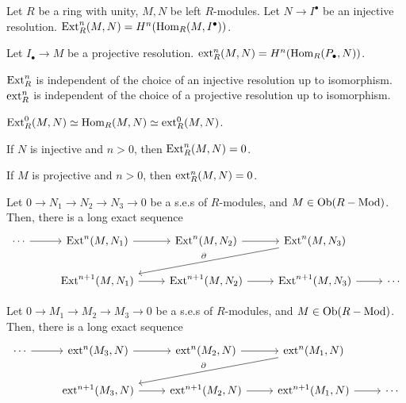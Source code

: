 \documentclass{article}
\begin{document}
\begin{definition}
  Let \(R\) be a ring with unity, \(M, N\) be left \(R\)-modules.
  Let \(N \to I^\bullet\) be an injective resolution.
  \(\textnormal{Ext}_R^n(M, N) = H^n(\textnormal{Hom}_R(M, I^\bullet))\).

  Let \(I_\bullet \to M\) be a projective resolution.
  \(\textnormal{ext}_R^n(M, N) = H^n(\textnormal{Hom}_R(P_\bullet, N))\).
\end{definition}

\begin{theorem}
  \(\textnormal{Ext}_R^n\) is independent of the choice of an injective resolution
  up to isomorphism.
  \(\textnormal{ext}_R^n\) is independent of the choice of a projective resolution
  up to isomorphism.
\end{theorem}

\begin{theorem}
  \(\textnormal{Ext}_R^0(M, N) \simeq \textnormal{Hom}_R(M, N) \simeq \textnormal{ext}_R^0(M, N)\).
\end{theorem}

\begin{theorem}
  If \(N\) is injective and \(n > 0\),
  then \(\textnormal{Ext}_R^n(M, N) = 0\).

  If \(M\) is projective and \(n > 0\),
  then \(\textnormal{ext}_R^n(M, N) = 0\).
\end{theorem}

\begin{theorem}
  Let \(0 \to N_1 \to N_2 \to N_3 \to 0\) be a s.e.s of \(R\)-modules,
  and \(M \in \textnormal{Ob}(R-\textnormal{Mod})\).
  Then, there is a long exact sequence
  \[\begin{tikzcd}
    \cdots \ar{r} & \Ext^n(M, N_1) \ar{r} & \Ext^n(M, N_2) \ar{r} & \Ext^n(M, N_3) \ar[swap, "\partial"]{lld} \\
    & \Ext^{n+1}(M, N_1) \ar{r} & \Ext^{n+1}(M, N_2) \ar{r} & \Ext^{n+1}(M, N_3) \ar{r} & \cdots
  \end{tikzcd}\]
\end{theorem}

\begin{theorem}
  Let \(0 \to M_1 \to M_2 \to M_3 \to 0\) be a s.e.s of \(R\)-modules,
  and \(M \in \textnormal{Ob}(R-\textnormal{Mod})\).
  Then, there is a long exact sequence
  \[\begin{tikzcd}
    \cdots \ar{r} & \ext^n(M_3, N) \ar{r} & \ext^n(M_2, N) \ar{r} & \ext^n(M_1, N) \ar[swap, "\partial"]{lld} \\
    & \ext^{n+1}(M_3, N) \ar{r} & \ext^{n+1}(M_2, N) \ar{r} & \ext^{n+1}(M_1, N) \ar{r} & \cdots
  \end{tikzcd}\]
\end{theorem}
\end{document}
